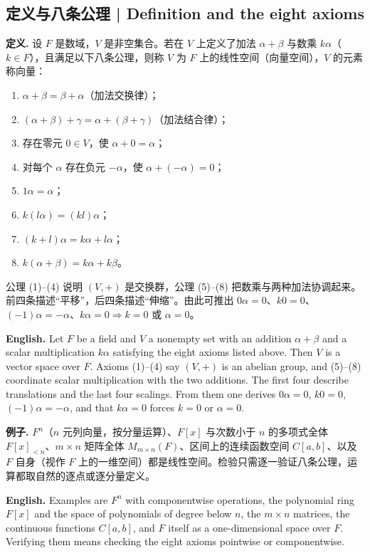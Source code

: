 \documentclass[UTF8,11pt,a4paper]{ctexart}
\newcommand{\EN}[1]{\par\noindent\textbf{English.} #1\par}
\begin{document}
\subsection{定义与八条公理 | Definition and the eight axioms}
\noindent\textbf{定义.} 设 $F$ 是数域，$V$ 是非空集合。若在 $V$ 上定义了加法 $\alpha+\beta$ 与数乘 $k\alpha$（$k\in F$），且满足以下八条公理，则称 $V$ 为 $F$ 上的线性空间（向量空间），$V$ 的元素称向量：
\begin{enumerate}[label=(\arabic*),leftmargin=2.4em,itemsep=1pt]
\item $\alpha+\beta=\beta+\alpha$（加法交换律）；
\item $(\alpha+\beta)+\gamma=\alpha+(\beta+\gamma)$（加法结合律）；
\item 存在零元 $0\in V$，使 $\alpha+0=\alpha$；
\item 对每个 $\alpha$ 存在负元 $-\alpha$，使 $\alpha+(-\alpha)=0$；
\item $1\alpha=\alpha$；
\item $k(l\alpha)=(kl)\alpha$；
\item $(k+l)\alpha=k\alpha+l\alpha$；
\item $k(\alpha+\beta)=k\alpha+k\beta$。
\end{enumerate}
公理 (1)--(4) 说明 $(V,+)$ 是交换群，公理 (5)--(8) 把数乘与两种加法协调起来。前四条描述“平移”，后四条描述“伸缩”。由此可推出 $0\alpha=0$、$k0=0$、$(-1)\alpha=-\alpha$、$k\alpha=0\Rightarrow k=0$ 或 $\alpha=0$。
\EN{Let $F$ be a field and $V$ a nonempty set with an addition $\alpha+\beta$ and a scalar multiplication $k\alpha$ satisfying the eight axioms listed above. Then $V$ is a vector space over $F$. Axioms (1)--(4) say $(V,+)$ is an abelian group, and (5)--(8) coordinate scalar multiplication with the two additions. The first four describe translations and the last four scalings. From them one derives $0\alpha=0$, $k0=0$, $(-1)\alpha=-\alpha$, and that $k\alpha=0$ forces $k=0$ or $\alpha=0$.}
\noindent\textbf{例子.} $F^n$（$n$ 元列向量，按分量运算）、$F[x]$ 与次数小于 $n$ 的多项式全体 $F[x]_{<n}$、$m\times n$ 矩阵全体 $M_{m\times n}(F)$、区间上的连续函数空间 $C[a,b]$、以及 $F$ 自身（视作 $F$ 上的一维空间）都是线性空间。检验只需逐一验证八条公理，运算都取自然的逐点或逐分量定义。
\EN{Examples are $F^n$ with componentwise operations, the polynomial ring $F[x]$ and the space of polynomials of degree below $n$, the $m\times n$ matrices, the continuous functions $C[a,b]$, and $F$ itself as a one-dimensional space over $F$. Verifying them means checking the eight axioms pointwise or componentwise.}
\end{document}
